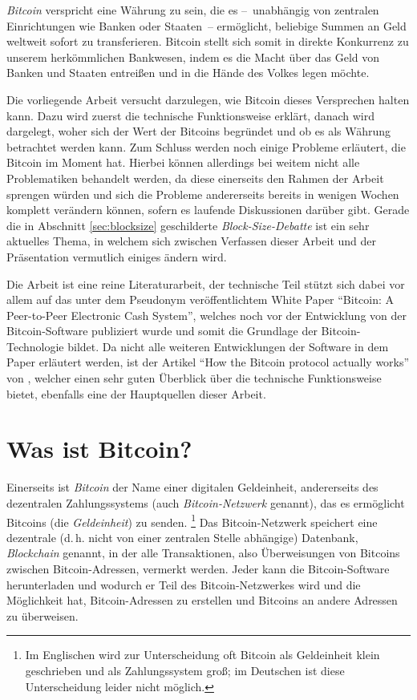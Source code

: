 \emph{Bitcoin} verspricht eine Währung zu sein, die es --~unabhängig von zentralen Einrichtungen wie Banken oder Staaten~-- ermöglicht, beliebige Summen an Geld weltweit sofort zu transferieren.
Bitcoin stellt sich somit in direkte Konkurrenz zu unserem herkömmlichen Bankwesen, indem es die Macht über das Geld von Banken und Staaten entreißen und in die Hände des Volkes legen möchte.

Die vorliegende Arbeit versucht darzulegen, wie Bitcoin dieses Versprechen halten kann.
Dazu wird zuerst die technische Funktionsweise erklärt, danach wird dargelegt, woher sich der Wert der Bitcoins begründet und ob es als Währung betrachtet werden kann.
Zum Schluss werden noch einige Probleme erläutert, die Bitcoin im Moment hat.
Hierbei können allerdings bei weitem nicht alle Problematiken behandelt werden, da diese einerseits den Rahmen der Arbeit sprengen würden und sich die Probleme andererseits bereits in wenigen Wochen komplett verändern können, sofern es laufende Diskussionen darüber gibt.
Gerade die in Abschnitt \ref{sec:blocksize} geschilderte \emph{Block-Size-Debatte} ist ein sehr aktuelles Thema, in welchem sich zwischen Verfassen dieser Arbeit und der Präsentation vermutlich einiges ändern wird.

Die Arbeit ist eine reine Literaturarbeit, der technische Teil stützt sich dabei vor allem auf das unter dem Pseudonym  veröffentlichtem White Paper "`Bitcoin: A Peer-to-Peer Electronic Cash System"', welches noch vor der Entwicklung von der Bitcoin-Software publiziert wurde und somit die Grundlage der Bitcoin-Technologie bildet. \parencite{nakamoto}
Da nicht alle weiteren Entwicklungen der Software in dem Paper erläutert werden, ist der Artikel "`How the Bitcoin protocol actually works"' von , welcher einen sehr guten Überblick über die technische Funktionsweise bietet, ebenfalls eine der Hauptquellen dieser Arbeit. \parencite{nielsen}

\section{Was ist Bitcoin?}
\label{sec:bitcoinintro}

Einerseits ist \emph{Bitcoin} der Name einer digitalen Geldeinheit, andererseits des dezentralen Zahlungssystems (auch \emph{Bitcoin-Netzwerk} genannt), das es ermöglicht Bitcoins (die \emph{Geldeinheit}) zu senden.%
\footnote{Im Englischen wird zur Unterscheidung oft Bitcoin als Geldeinheit klein geschrieben und als Zahlungssystem groß; im Deutschen ist diese Unterscheidung leider nicht möglich.}
Das Bitcoin-Netzwerk speichert eine dezentrale (d.\,h. nicht von einer zentralen Stelle abhängige) Datenbank, \emph{Blockchain} genannt, in der alle Transaktionen, also Überweisungen von Bitcoins zwischen Bitcoin-Adressen, vermerkt werden.
Jeder kann die Bitcoin-Software herunterladen und wodurch er Teil des Bitcoin-Netzwerkes wird und die Möglichkeit hat, Bitcoin-Adressen zu erstellen und Bitcoins an andere Adressen zu überweisen.
